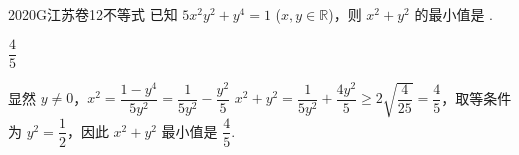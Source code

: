 
\begin{problem}{2020}{G}{江苏卷}{12}{不等式}
已知 $ 5x^2y^2 + y^4 = 1 $ ($ x, y \in \mathbb{R} $)，则 $ x^2 + y^2 $ 的最小值是 \underline{\hspace{4em}}.
\end{problem}

\begin{answer}
$ \dfrac{4}{5} $
\end{answer}

\begin{solutions}
显然 $ y \ne 0 $，$ x^2 = \dfrac{1 - y^4}{5y^2} = \dfrac{1}{5y^2} - \dfrac{y^2}{5} $  
$ x^2 + y^2 = \dfrac{1}{5y^2} + \dfrac{4y^2}{5} \ge 2\sqrt{ \dfrac{4}{25} } = \dfrac{4}{5} $，取等条件为 $ y^2 = \dfrac{1}{2} $，因此 $ x^2 + y^2 $ 最小值是 $ \dfrac{4}{5} $.
\end{solutions}
